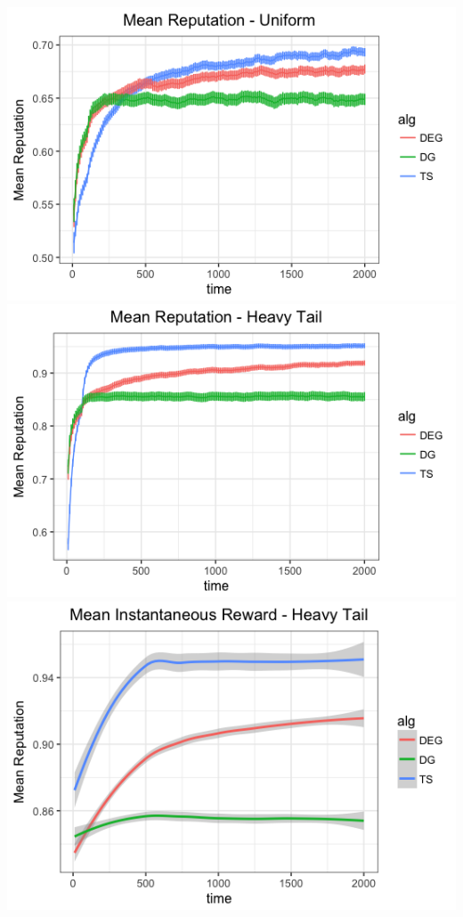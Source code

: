 \documentclass[../competing_bandits_with_appendix.tex]{subfiles}
\begin{document}
\begin{appendices}
\begin{center}
\includegraphics[scale=0.25]{appendix_figures/uniform_mean}
\includegraphics[scale=0.25]{appendix_figures/ht_mean}
\includegraphics[scale=0.25]{appendix_figures/mean_inst_reward_ht}

\end{center}
\end{appendices}
\end{document}
